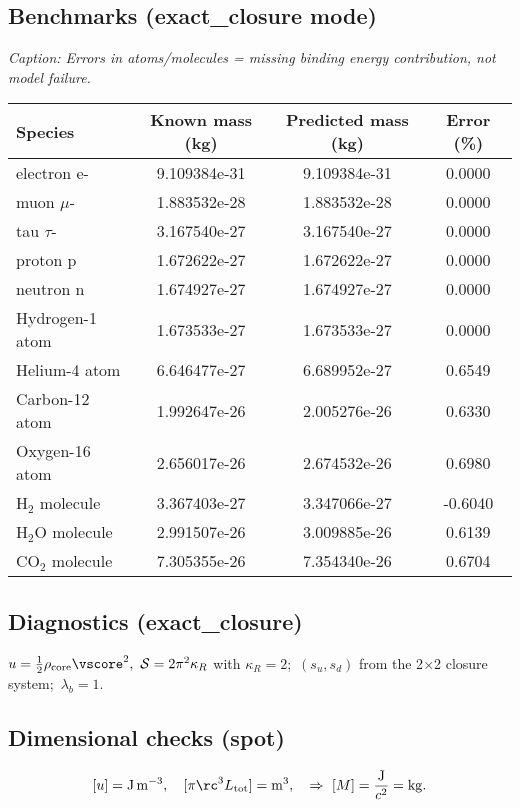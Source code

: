 \documentclass[11pt]{article}
\begin{document}
    \subsection*{Benchmarks (exact\_closure mode)}
        \emph{Caption: Errors in atoms/molecules = missing binding energy contribution, not model failure.}
        \begin{center}
        \begin{tabular}{lccc}
        \toprule
        Species & Known mass (kg) & Predicted mass (kg) & Error (\%)\\
        \midrule
        electron e- & 9.109384e-31 & 9.109384e-31 & 0.0000\\
        muon $\mu$- & 1.883532e-28 & 1.883532e-28 & 0.0000\\
        tau $\tau$- & 3.167540e-27 & 3.167540e-27 & 0.0000\\
        proton p & 1.672622e-27 & 1.672622e-27 & 0.0000\\
        neutron n & 1.674927e-27 & 1.674927e-27 & 0.0000\\
        Hydrogen-1 atom & 1.673533e-27 & 1.673533e-27 & 0.0000\\
        Helium-4 atom & 6.646477e-27 & 6.689952e-27 & 0.6549\\
        Carbon-12 atom & 1.992647e-26 & 2.005276e-26 & 0.6330\\
        Oxygen-16 atom & 2.656017e-26 & 2.674532e-26 & 0.6980\\
        H$_2$ molecule & 3.367403e-27 & 3.347066e-27 & -0.6040\\
        H$_2$O molecule & 2.991507e-26 & 3.009885e-26 & 0.6139\\
        CO$_2$ molecule & 7.305355e-26 & 7.354340e-26 & 0.6704\\
        \bottomrule
        \end{tabular}
        \end{center}

    \subsection*{Diagnostics (exact\_closure)}
        $u=\tfrac12\rho_{\rm core}\vscore^2,\ \mathcal S=2\pi^2\kappa_R$ with $\kappa_R=2$;\
        $(s_u,s_d)$ from the 2$\times$2 closure system;\
        $\lambda_b=1$.

    \subsection*{Dimensional checks (spot)}
        \[
            [u]=\mathrm{J\,m^{-3}},\quad [\pi \rc^3 L_{\rm tot}] = \mathrm{m^3},\quad
            \Rightarrow\ [M] = \frac{\mathrm{J}}{c^2}=\mathrm{kg}.
        \]
\end{document}
